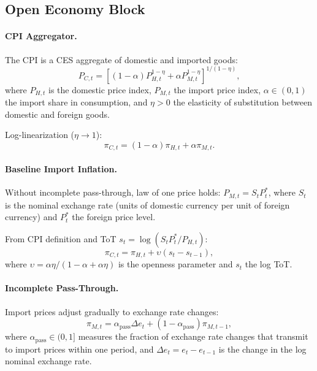 \documentclass[12pt,a4paper]{article}
\begin{document}
\begin{appendices}
\subsection{Open Economy Block}
\label{app:openeconomy}

\paragraph{CPI Aggregator.}
The CPI is a CES aggregate of domestic and imported goods:
\begin{equation}
	P_{C,t} = \left[ (1-\alpha) P_{H,t}^{1-\eta} + \alpha P_{M,t}^{1-\eta} \right]^{1/(1-\eta)},
	\label{eq:app_cpi}
\end{equation}
where $P_{H,t}$ is the domestic price index, $P_{M,t}$ the import price index, $\alpha \in (0,1)$ the import share in consumption, and $\eta > 0$ the elasticity of substitution between domestic and foreign goods.

Log-linearization ($\eta \to 1$):
\begin{equation}
	\pi_{C,t} = (1-\alpha)\pi_{H,t} + \alpha \pi_{M,t}.
	\label{eq:app_cpi_inflation}
\end{equation}

\paragraph{Baseline Import Inflation.}
Without incomplete pass-through, law of one price holds: $P_{M,t} = S_t P_t^*$, where $S_t$ is the nominal exchange rate (units of domestic currency per unit of foreign currency) and $P_t^*$ the foreign price level.

From CPI definition and ToT $s_t = \log(S_t P_t^*/P_{H,t})$:
\begin{equation}
	\pi_{C,t} = \pi_{H,t} + \upsilon(s_t - s_{t-1}),
	\label{eq:app_cpi_baseline}
\end{equation}
where $\upsilon = \alpha\eta/(1-\alpha+\alpha\eta)$ is the openness parameter and $s_t$ the log ToT.

\paragraph{Incomplete Pass-Through.}
Import prices adjust gradually to exchange rate changes:
\begin{equation}
	\pi_{M,t} = \alpha_{\text{pass}}\Delta e_t + (1-\alpha_{\text{pass}})\pi_{M,t-1},
	\label{eq:app_import_incomplete}
\end{equation}
where $\alpha_{\text{pass}} \in (0,1]$ measures the fraction of exchange rate changes that transmit to import prices within one period, and $\Delta e_t = e_t - e_{t-1}$ is the change in the log nominal exchange rate.


\end{appendices}
\end{document}

